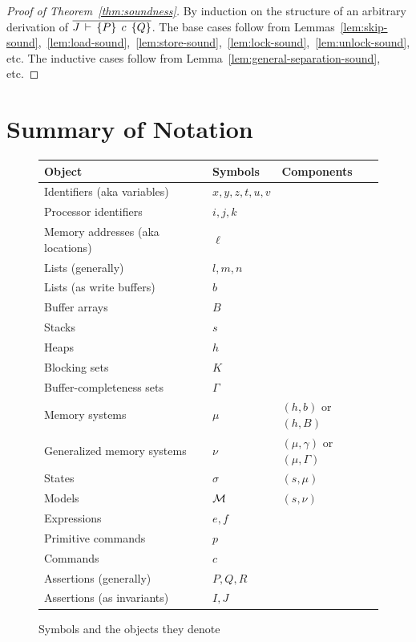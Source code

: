 \documentclass[11pt]{report}
\begin{document}
\begin{proof}[Proof of Theorem~\ref{thm:soundness}]

By induction on the structure of an arbitrary derivation of $\overline{J\,\vdash\,\left\lbrace P \right\rbrace\;c\;\left\lbrace Q \right\rbrace}$. The base cases follow from Lemmas~\ref{lem:skip-sound},~\ref{lem:load-sound},~\ref{lem:store-sound},~\ref{lem:lock-sound},~\ref{lem:unlock-sound}, etc. The inductive cases follow from Lemma~\ref{lem:general-separation-sound}, etc. 

\end{proof}

\section{Summary of Notation}

\begin{figure}
\centering
\begin{tabular}{l|l|l}
Object & Symbols & Components\\  
\hline 
Identifiers (aka variables) & $x,y,z,t,u,v$ & \\
Processor identifiers & $i,j,k$ & \\ 
Memory addresses (aka locations) & $\ell$ & \\ 
Lists (generally) & $l,m,n$ & \\ 
Lists (as write buffers) & $b$ & \\ 
Buffer arrays & $B$ & \\ 
Stacks & $s$ & \\ 
Heaps & $h$ & \\ 
Blocking sets & $K$ & \\ 
Buffer-completeness sets & $\Gamma$ & \\ 
Memory systems & $\mu$ & $(h,b)$ or $(h,B)$\\ 
Generalized memory systems & $\nu$ & $(\mu,\gamma)$ or $(\mu,\Gamma)$ \\ 
States & $\sigma$ & $(s,\mu)$\\ 
Models & $\mathcal{M}$ & $(s,\nu)$\\ 
Expressions & $e,f$ \\ 
Primitive commands & $p$ \\
Commands & $c$ \\ 
Assertions (generally) & $P,Q,R$ \\
Assertions (as invariants) & $I,J$ \\
\end{tabular}
\caption{Symbols and the objects they denote\label{fig:objects-and-symbols}}
\end{figure}
\end{document}
